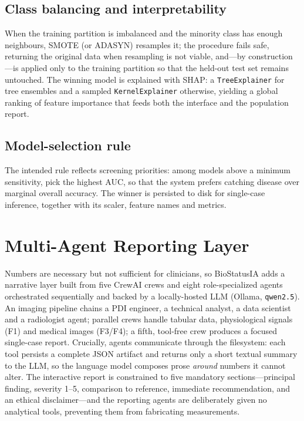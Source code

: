 \documentclass[10pt,twocolumn]{article}
\begin{document}
\subsection{Class balancing and interpretability}
When the training partition is imbalanced and the minority class has enough
neighbours, SMOTE (or ADASYN) resamples it; the procedure fails safe, returning
the original data when resampling is not viable, and---by construction---is
applied only to the training partition so that the held-out test set remains
untouched. The winning model is explained with SHAP: a \texttt{TreeExplainer}
for tree ensembles and a sampled \texttt{KernelExplainer} otherwise, yielding a
global ranking of feature importance that feeds both the interface and the
population report.

\subsection{Model-selection rule}
The intended rule reflects screening priorities: among models above a minimum
sensitivity, pick the highest AUC, so that the system prefers catching disease
over marginal overall accuracy. The winner is persisted to disk for single-case
inference, together with its scaler, feature names and metrics.

\section{Multi-Agent Reporting Layer}
Numbers are necessary but not sufficient for clinicians, so BioStatusIA adds a
narrative layer built from five CrewAI crews and eight role-specialized agents
orchestrated sequentially and backed by a locally-hosted LLM
(Ollama, \texttt{qwen2.5}). An imaging pipeline chains a PDI engineer, a
technical analyst, a data scientist and a radiologist agent; parallel crews
handle tabular data, physiological signals (F1) and medical images (F3/F4);
a fifth, tool-free crew produces a focused single-case report. Crucially, agents
communicate through the filesystem: each tool persists a complete JSON artifact
and returns only a short textual summary to the LLM, so the language model
composes prose \emph{around} numbers it cannot alter. The interactive report is
constrained to five mandatory sections---principal finding, severity 1--5,
comparison to reference, immediate recommendation, and an ethical
disclaimer---and the reporting agents are deliberately given no analytical
tools, preventing them from fabricating measurements.
\end{document}
